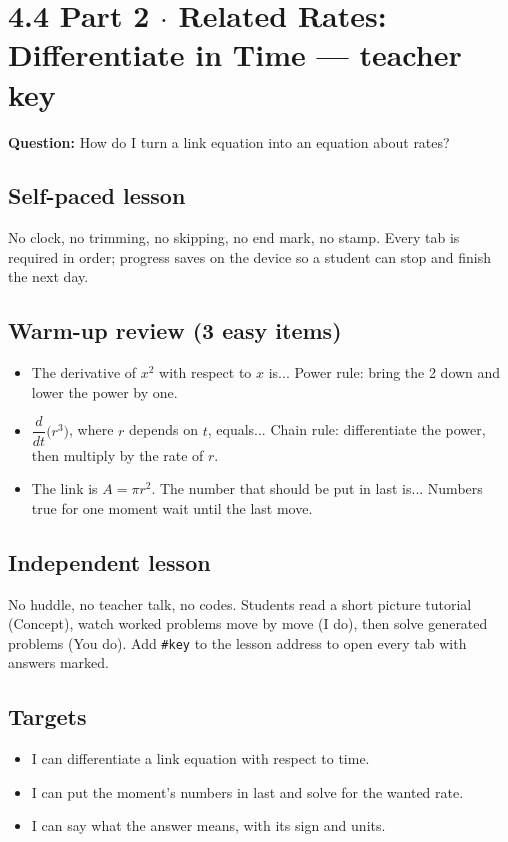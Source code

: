 \documentclass[11pt]{article}
\begin{document}
\section*{4.4 Part 2 $\cdot$ Related Rates: Differentiate in Time --- teacher key}
\textbf{Question:} How do I turn a link equation into an equation about rates?\par
\subsection*{Self-paced lesson}No clock, no trimming, no skipping, no end mark, no stamp. Every tab is required in order; progress saves on the device so a student can stop and finish the next day.\par
\subsection*{Warm-up review (3 easy items)}\begin{itemize}
\item The derivative of $x^2$ with respect to $x$ is...  Power rule: bring the 2 down and lower the power by one.
\item $\dfrac{d}{dt}\bigl(r^3\bigr)$, where $r$ depends on $t$, equals...  Chain rule: differentiate the power, then multiply by the rate of $r$.
\item The link is $A=\pi r^2$. The number that should be put in last is...  Numbers true for one moment wait until the last move.
\end{itemize}
\subsection*{Independent lesson}No huddle, no teacher talk, no codes. Students read a short picture tutorial (Concept), watch worked problems move by move (I do), then solve generated problems (You do). Add \texttt{\#key} to the lesson address to open every tab with answers marked.\par
\subsection*{Targets}\begin{itemize}\item I can differentiate a link equation with respect to time.
\item I can put the moment's numbers in last and solve for the wanted rate.
\item I can say what the answer means, with its sign and units.\end{itemize}
\end{document}
